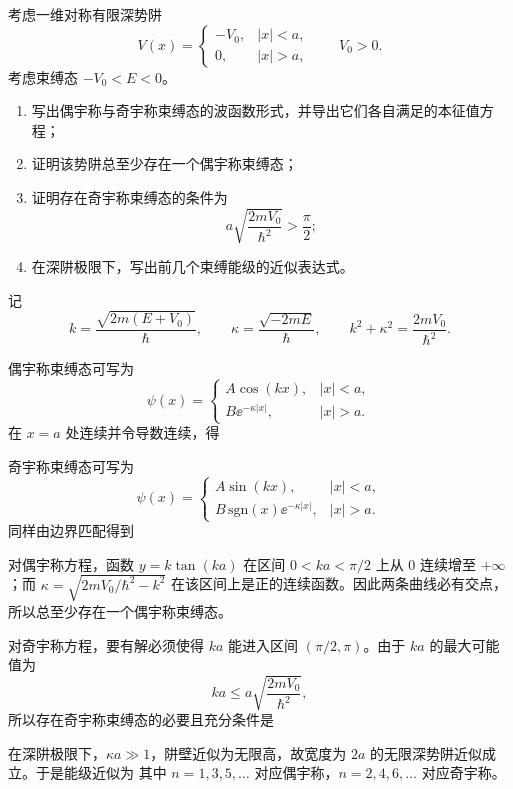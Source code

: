 \begin{question}
考虑一维对称有限深势阱
\[
V(x)=
\begin{cases}
-V_0,& |x|<a,\\
0,& |x|>a,
\end{cases}
\qquad V_0>0.
\]
考虑束缚态 $-V_0<E<0$。

\begin{enumerate}[label=(\arabic*),leftmargin=2.5em]
  \item 写出偶宇称与奇宇称束缚态的波函数形式，并导出它们各自满足的本征值方程；
  \item 证明该势阱总至少存在一个偶宇称束缚态；
  \item 证明存在奇宇称束缚态的条件为
  \[
  a\sqrt{\frac{2mV_0}{\hbar^2}}>\frac{\pi}{2};
  \]
  \item 在深阱极限下，写出前几个束缚能级的近似表达式。
\end{enumerate}

\begin{solution}
记
\[
k=\frac{\sqrt{2m(E+V_0)}}{\hbar},
\qquad
\kappa=\frac{\sqrt{-2mE}}{\hbar},
\qquad
k^2+\kappa^2=\frac{2mV_0}{\hbar^2}.
\]

偶宇称束缚态可写为
\[
\psi(x)=
\begin{cases}
A\cos(kx),& |x|<a,\\
B \ee^{-\kappa |x|},& |x|>a.
\end{cases}
\]
在 $x=a$ 处连续并令导数连续，得

奇宇称束缚态可写为
\[
\psi(x)=
\begin{cases}
A\sin(kx),& |x|<a,\\
B\,\mathrm{sgn}(x)\ee^{-\kappa |x|},& |x|>a.
\end{cases}
\]
同样由边界匹配得到

对偶宇称方程，函数 $y=k\tan(ka)$ 在区间 $0<ka<\pi/2$ 上从 $0$ 连续增至 $+\infty$；而 $\kappa=\sqrt{2mV_0/\hbar^2-k^2}$ 在该区间上是正的连续函数。因此两条曲线必有交点，所以总至少存在一个偶宇称束缚态。

对奇宇称方程，要有解必须使得 $ka$ 能进入区间 $(\pi/2,\pi)$。由于 $ka$ 的最大可能值为
\[
ka\le a\sqrt{\frac{2mV_0}{\hbar^2}},
\]
所以存在奇宇称束缚态的必要且充分条件是

在深阱极限下，$\kappa a\gg 1$，阱壁近似为无限高，故宽度为 $2a$ 的无限深势阱近似成立。于是能级近似为
其中 $n=1,3,5,\dots$ 对应偶宇称，$n=2,4,6,\dots$ 对应奇宇称。
\end{solution}
\end{question}

